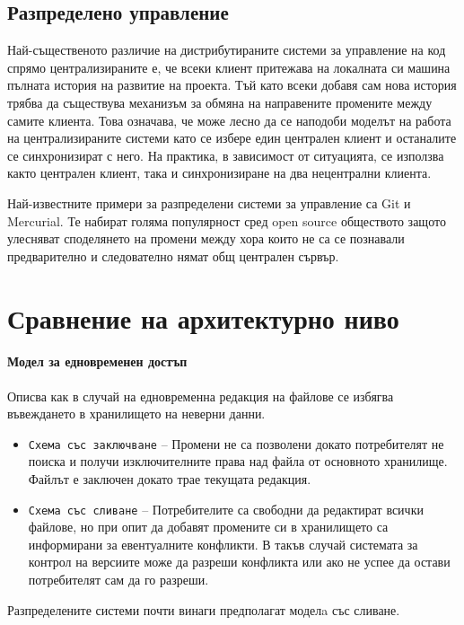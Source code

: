 \documentclass[a4paper]{article}
\begin{document}
  \subsection{Разпределено управление}
  Най-същественото различие на дистрибутираните системи за управление на код
  спрямо централизираните е, че всеки клиент притежава на локалната си машина
  пълната история на развитие на проекта.  Тъй като всеки добавя сам нова
  история трябва да съществува механизъм за обмяна на направените промените между
  самите клиента. Това означава, че може лесно да се наподоби моделът на работа
  на централизираните системи като се избере един централен клиент и останалите
  се синхронизират с него. На практика, в зависимост от ситуацията, се използва
  както централен клиент, така и синхронизиране на два нецентрални клиента.
  
  Най-известните примери за разпределени системи за управление са
  Git\cite{git} и Mercurial\cite{mercurial}. Те набират голяма популярност
  сред open source обществото защото улесняват споделянето на промени между
  хора които не са се познавали предварително и следователно нямат общ
  централен сървър.

\section{Сравнение на архитектурно ниво}

  \paragraph{Модел за едновременен достъп}
  Описва как в случай на едновременна редакция на файлове се избягва въвеждането в хранилището на неверни данни.
  \begin{itemize}
    \item \texttt{Схема със заключване} -- Промени не са позволени докато потребителят не поиска и получи изключителните права над файла от основното хранилище. Файлът е заключен докато трае текущата редакция.
    \item \texttt{Схема със сливане} -- Потребителите са свободни да редактират всички файлове, но при опит да добавят промените си в хранилището са информирани за евентуалните конфликти. В такъв случай системата за контрол на версиите може да разреши конфликта или ако не успее да остави потребителят сам да го разреши.
  \end{itemize}
  Разпределените системи почти винаги предполагат моделa със сливане.
\end{document}
